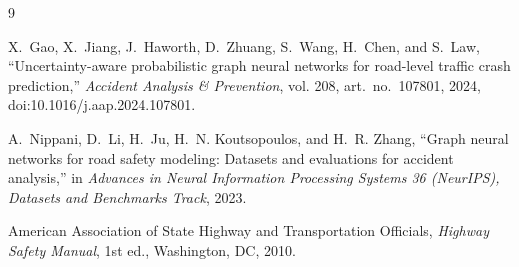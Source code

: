 \documentclass[conference]{IEEEtran}
\begin{document}
\begin{thebibliography}{9}

X.~Gao, X.~Jiang, J.~Haworth, D.~Zhuang, S.~Wang, H.~Chen, and S.~Law,
``Uncertainty-aware probabilistic graph neural networks for road-level
traffic crash prediction,'' \emph{Accident Analysis \& Prevention}, vol.
208, art.\ no.\ 107801, 2024, doi:10.1016/j.aap.2024.107801.

A.~Nippani, D.~Li, H.~Ju, H.~N. Koutsopoulos, and H.~R. Zhang, ``Graph neural
networks for road safety modeling: Datasets and evaluations for accident
analysis,'' in \emph{Advances in Neural Information Processing Systems 36
(NeurIPS), Datasets and Benchmarks Track}, 2023.

American Association of State Highway and Transportation Officials,
\emph{Highway Safety Manual}, 1st ed., Washington, DC, 2010.

\end{thebibliography}
\end{document}
